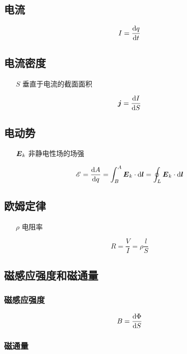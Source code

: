 \documentclass{article}
\begin{document}
\subsection{电流}

\[I=\frac{\mathrm d q}{\mathrm d t}\]

\subsection{电流密度}

\begin{enumerate}
    \item[$S$] 垂直于电流的截面面积
\end{enumerate}

\[\boldsymbol{j}=\frac{\mathrm d I}{\mathrm d S}\]

\subsection{电动势}

\begin{enumerate}
    \item [$\boldsymbol{E}_k$] 非静电性场的场强
\end{enumerate}

\[\mathscr E=\frac{\mathrm d A}{\mathrm d q}=\int_B^A\boldsymbol{E}_k\cdot\mathrm d\boldsymbol{l}=\oint_L\boldsymbol{E}_k\cdot\mathrm d\boldsymbol{l}\]

\subsection{欧姆定律}

\begin{enumerate}
    \item [$\rho$] 电阻率
\end{enumerate}

\[R=\frac VI=\rho\frac lS\]

\subsection{磁感应强度和磁通量}

\subsubsection{磁感应强度}

\[B=\frac{\mathrm d\Phi}{\mathrm d S}\]

\subsubsection{磁通量}
\end{document}
